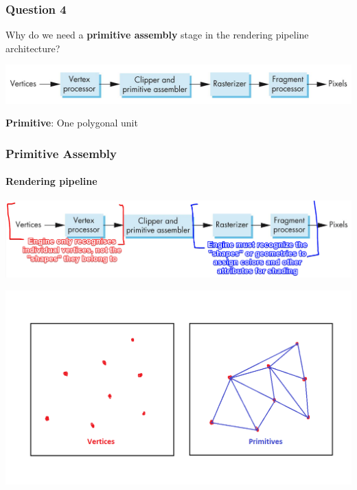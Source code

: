 \documentclass{beamer}
\begin{document}
\begin{frame}
    \frametitle{Question 4}
    Why do we need a \textbf{primitive assembly} stage in the rendering pipeline architecture?

    \vspace{1em}

    {\centering \includegraphics[scale=0.4]{simple-pipeline.png}}

    \begin{tcolorbox}
        \textbf{Primitive}: One polygonal unit
    \end{tcolorbox}
\end{frame}

\begin{frame}
    \frametitle{Primitive Assembly}
    \framesubtitle{Rendering pipeline}
    
    {\centering \includegraphics[scale=0.4]{simple-pipeline-annot.png}}

    \vspace{1em}

    {\begin{center} \includegraphics[scale=0.3]{q4-vert-prim.png} \end{center}}

\end{frame}
\end{document}
